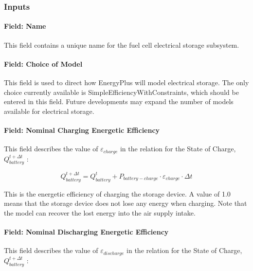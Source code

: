 \subsubsection{Inputs}\label{inputs-17-000}

\paragraph{Field: Name}\label{field-name-20}

This field contains a unique name for the fuel cell electrical storage subsystem.

\paragraph{Field: Choice of Model}\label{field-choice-of-model}

This field is used to direct how EnergyPlus will model electrical storage. The only choice currently available is SimpleEfficiencyWithConstraints, which should be entered in this field. Future developments may expand the number of models available for electrical storage.

\paragraph{Field: Nominal Charging Energetic Efficiency}\label{field-nominal-charging-energetic-efficiency}

This field describes the value of \({\varepsilon_{charge}}\) in the relation for the State of Charge, \(Q_{battery}^{t + \Delta t}\) :

\begin{equation}
Q_{battery}^{t + \Delta t} = Q_{battery}^t + {P_{battery - charge}} \cdot {\varepsilon_{charge}} \cdot \Delta t
\end{equation}

This is the energetic efficiency of charging the storage device. A value of 1.0 means that the storage device does not lose any energy when charging. Note that the model can recover the lost energy into the air supply intake.

\paragraph{Field: Nominal Discharging Energetic Efficiency}\label{field-nominal-discharging-energetic-efficiency-1}

This field describes the value of \({\varepsilon_{discharge}}\) in the relation for the State of Charge, \(Q_{battery}^{t + \Delta t}\) :

